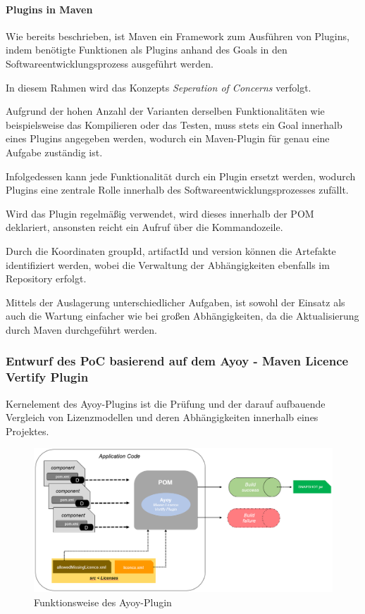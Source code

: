 \paragraph{Plugins in Maven}

Wie bereits beschrieben, ist Maven ein Framework zum Ausführen von Plugins, indem benötigte Funktionen als Plugins anhand des Goals in den Softwareentwicklungsprozess ausgeführt werden.

In diesem Rahmen wird das Konzepts \textit{Seperation of Concerns} verfolgt. 

Aufgrund der hohen Anzahl der Varianten derselben Funktionalitäten wie beispielsweise das Kompilieren oder das Testen, muss stets ein Goal innerhalb eines Plugins angegeben werden, wodurch ein Maven-Plugin für genau eine Aufgabe zuständig ist. 

Infolgedessen kann jede Funktionalität durch ein Plugin ersetzt werden, wodurch Plugins eine zentrale Rolle innerhalb des Softwareentwicklungsprozesses zufällt. 

Wird das Plugin regelmäßig verwendet, wird dieses innerhalb der POM deklariert, ansonsten reicht ein Aufruf über die Kommandozeile.  

Durch die Koordinaten groupId, artifactId und version können die Artefakte identifiziert werden, wobei die Verwaltung der Abhängigkeiten ebenfalls im Repository erfolgt. 

Mittels der Auslagerung unterschiedlicher Aufgaben, ist sowohl der Einsatz als auch die Wartung einfacher wie bei großen Abhängigkeiten, da die Aktualisierung durch Maven durchgeführt werden.  

\subsubsection{Entwurf des PoC basierend auf dem Ayoy - Maven Licence Vertify Plugin}

Kernelement des Ayoy-Plugins ist die Prüfung und der darauf aufbauende Vergleich von Lizenzmodellen und deren Abhängigkeiten innerhalb eines Projektes.

\begin{figure}[h]
    \centering
    \includegraphics[scale=0.4]{Bilder/Ayoy-Plugin.png}
    \caption{Funktionsweise des Ayoy-Plugin}
\end{figure}

